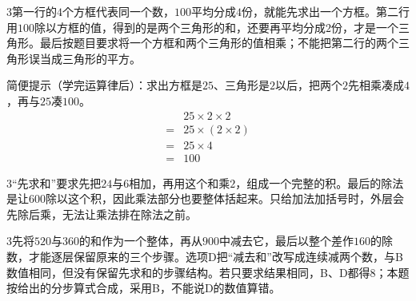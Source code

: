 \documentclass[multi=snippet,border={5bp 20bp 5bp 5bp}]{standalone}
\newenvironment{snippet}[3]{\begin{minipage}{#1bp}\color{answerred}\fontsize{#2}{#3}\selectfont\raggedright}{\end{minipage}}
\begin{document}
\begin{snippet}{505}{11.5}{14}\begin{multicols}{3}\raggedcolumns 第一行的\(4\)\allowbreak 个方框代表同一个数，\(100\)\allowbreak 平均分成\(4\)\allowbreak 份，就能先求出一个方框。第二行用\(100\)\allowbreak 除以方框的值，得到的是两个三角形的和，还要再平均分成\(2\)\allowbreak 份，才是一个三角形。最后按题目要求将一个方框和两个三角形的值相乘；不能把第二行的两个三角形误当成三角形的平方。\par 简便提示（学完运算律后）：求出方框是\(25\)\allowbreak 、三角形是\(2\)\allowbreak 以后，把两个\(2\)\allowbreak 先相乘凑成\(4\)\allowbreak ，再与\(25\)\allowbreak 凑\(100\)\allowbreak 。\[\begin{aligned}&25\times2\times2\\={}&25\times(2\times2)\\={}&25\times4\\={}&100\end{aligned}\]\end{multicols}\end{snippet}
\begin{snippet}{505}{11.5}{14}\begin{multicols}{3}\raggedcolumns “先求和”要求先把\(24\)\allowbreak 与\(6\)\allowbreak 相加，再用这个和乘\(2\)\allowbreak ，组成一个完整的积。最后的除法是让\(600\)\allowbreak 除以这个积，因此乘法部分也要整体括起来。只给加法加括号时，外层会先除后乘，无法让乘法排在除法之前。\end{multicols}\end{snippet}
\begin{snippet}{505}{11.5}{14}\begin{multicols}{3}\raggedcolumns 先将\(520\)\allowbreak 与\(360\)\allowbreak 的和作为一个整体，再从\(900\)\allowbreak 中减去它，最后以整个差作\(160\)\allowbreak 的除数，才能逐层保留原来的三个步骤。选项D把“减去和”改写成连续减两个数，与B数值相同，但没有保留先求和的步骤结构。若只要求结果相同，B、D都得\(8\)\allowbreak ；本题按给出的分步算式合成，采用B，不能说D的数值算错。\end{multicols}\end{snippet}
\end{document}

